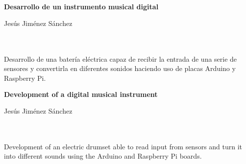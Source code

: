 
\chapter*{}   %

\cleardoublepage
\thispagestyle{empty}

\begin{center}
    {\large\bfseries Desarrollo de un instrumento musical digital}\\
\end{center}

\begin{center}
    Jesús Jiménez Sánchez\\
\end{center}

\\

\vspace{0.7cm}
\\

Desarrollo de una batería eléctrica capaz de recibir la entrada de una serie de sensores y convertirla en diferentes
sonidos haciendo uso de placas Arduino y Raspberry Pi.

\cleardoublepage

\thispagestyle{empty}

\begin{center}
       {\large\bfseries Development of a digital musical instrument}\\
\end{center}

\begin{center}
    Jesús Jiménez Sánchez\\
\end{center}

\\

\vspace{0.7cm}
\\

Development of an electric drumset able to read input from sensors and turn it into different sounds using the Arduino
and Raspberry Pi boards.

